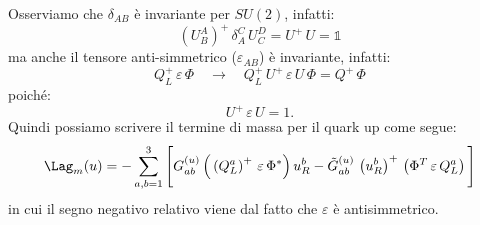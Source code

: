 Osserviamo che $\delta_{AB}$ è invariante per $SU(2)$, infatti:
\begin{equation}
    \left(U_B^A\right)^+\, \delta_A^C\, U_C^D = U^+\, U = \mathbb{1}
\end{equation}
ma anche il tensore anti-simmetrico ($\varepsilon_{AB}$) è invariante, infatti:
\begin{equation}
    Q_L^+\, \varepsilon\, \Phi \quad \longrightarrow \quad Q_L^+\, U^+\, \varepsilon\, U\, \Phi = Q^+\, \Phi
\end{equation}
poiché:
\begin{equation}
    U^+\, \varepsilon\, U = 1.
\end{equation}
Quindi possiamo scrivere il termine di massa per il quark up come segue:
\begin{equation}
    \Lag_m(u) = -\sum_{a,b=1}^3\Bigg[ G_{ab}^{(u)}\, \Big( \left(Q_L^a\right)^+\, \varepsilon\, \Phi^* \Big)\, u_R^b - \tilde{G}_{ab}^{(u)}\, \left(u_R^b\right)^+\, \left(\Phi^T\, \varepsilon\, Q_L^a \right) \Bigg]
\end{equation}
in cui il segno negativo relativo viene dal fatto che $\varepsilon$ è antisimmetrico.

